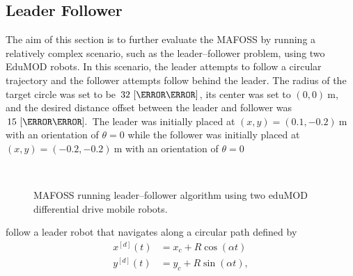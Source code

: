 \subsection{Leader Follower}
The aim of this section is to further evaluate the MAFOSS by running a relatively complex scenario, such as the leader--follower problem, using two EduMOD robots. In this scenario, the leader attempts to follow a circular trajectory and the follower attempts follow behind the leader. The radius of the target circle was set to be $32~[\centi\meter]$, its center was set to $(0,0)~\si{\meter}$, and the desired distance offset between the leader and follower was $15~[\centi\meter].$ The leader was initially placed at $(x,y) = (0.1, -0.2)~\si{\meter}$ with an orientation of $\theta = 0$ while the follower was initially placed at $(x,y) = (-0.2, -0.2)~\si{\meter}$ with an orientation of $\theta = 0$ %
\begin{figure}
    \centering
    \\
    \caption{MAFOSS running leader--follower algorithm using two eduMOD differential drive mobile robots.}
    \label{fig:trajectoryLeaderFollowerPictures}
\end{figure}
%
follow a leader robot that navigates along a circular path defined by %
%
\begin{subequations}
  \label{eq:refTrajectory}
\begin{align}
  x^{[d]}(t) &= x_c + R\cos(\alpha t)\\
  y^{[d]}(t) &= y_c + R\sin(\alpha t), 
\end{align}  
\end{subequations}

